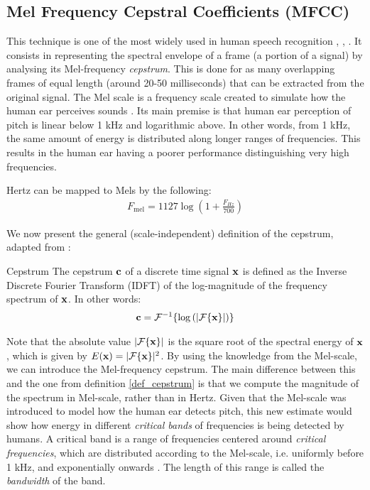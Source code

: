 \documentclass[../main.tex]{subfiles}
\begin{document}
\subsection{Mel Frequency Cepstral Coefficients (MFCC)} \label{subsection_mfcc}
\par This technique is one of the most widely used in human speech recognition \cite{Jurafsky2009}, \cite{Chou2008a}, \cite{Stowell2014}. It consists in representing the spectral envelope of a frame (a portion of a signal) by analysing its Mel-frequency \emph{cepstrum}. This is done for as many overlapping frames of equal length (around 20-50 milliseconds) that can be extracted from the original signal. The Mel scale is a frequency scale created to simulate how the human ear perceives sounds \cite{Sludge2000}. Its main premise is that human ear perception of pitch is linear below 1 kHz and logarithmic above. In other words, from 1 kHz, the same amount of energy is distributed along longer ranges of frequencies. This results in the human ear having a poorer performance distinguishing very high frequencies.
\par Hertz can be mapped to Mels by the following:
\begin{align*}
F_{\text{mel}} = 1127 \log{(1 + \frac{F_{Hz}}{700})}
\end{align*}
\theoremstyle{definition}
\par We now present the general (scale-independent) definition of the cepstrum, adapted from \cite{Gutierrez-Osuna2009}:
\begin{definition}{Cepstrum} \label{def_cepstrum}
The cepstrum $\mathbf{c}$ of a discrete time signal $\mathbf{x}$ is defined as the Inverse Discrete Fourier Transform (IDFT) of the log-magnitude of the frequency spectrum of $\mathbf{x}$. In other words:
\begin{align*}
\mathbf{c} = \mathcal{F}^{-1}\{\log{(\lvert\mathcal{F}\{\mathbf{x}\}\rvert)}\}
\end{align*}
\end{definition}
\par Note that the absolute value $\lvert\mathcal{F}\{\mathbf{x}\}\rvert$ is the square root of the spectral energy of $\mathbf{x}$, which is given by $E(\mathbf{x}) = \lvert\mathcal{F}\{\mathbf{x}\}\rvert^2$. By using the knowledge from the Mel-scale, we can introduce the Mel-frequency cepstrum. The main difference between this and the one from definition \ref{def_cepstrum} is that we compute the magnitude of the spectrum in Mel-scale, rather than in Hertz. Given that the Mel-scale was introduced to model how the human ear detects pitch, this new estimate would show how energy in different \emph{critical bands} of frequencies is being detected by humans. A critical band is a range of frequencies centered around \emph{critical frequencies}, which are distributed according to the Mel-scale, i.e. uniformly before 1 kHz, and exponentially onwards \cite{Gutierrez-Osuna2009}. The length of this range is called the \emph{bandwidth} of the band.
\end{document}
